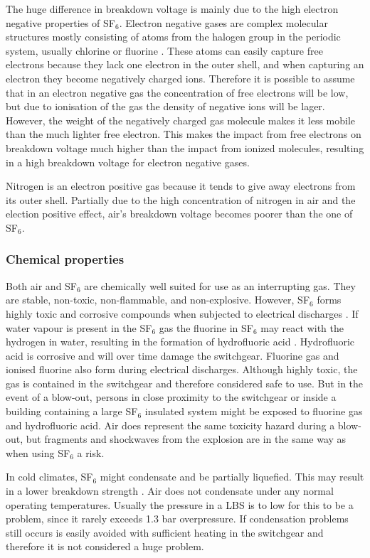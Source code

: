 \documentclass[10pt,a4paper,twoside]{article}
\begin{document}
The huge difference in breakdown voltage is mainly due to the high electron negative properties of SF$_6$. Electron negative gases are complex molecular structures mostly consisting of atoms from the halogen group in the periodic system, usually chlorine or fluorine \cite{bib:TET4160HVIM}. These atoms can easily capture free electrons because they lack one electron in the outer shell, and when capturing an electron they become negatively charged ions. Therefore it is possible to assume that in an electron negative gas the concentration of free electrons will be low, but due to ionisation of the gas the density of negative ions will be lager. However, the weight of the negatively charged gas molecule makes it less mobile than the much lighter free electron. This makes the impact from free electrons on breakdown voltage much higher than the impact from ionized molecules, resulting in a high breakdown voltage for electron negative gases.

Nitrogen is an electron positive gas because it tends to give away electrons from its outer shell. Partially due to the high concentration of nitrogen in air and the election positive effect, air's breakdown voltage becomes poorer than the one of SF$_6$.

\subsubsection*{Chemical properties}
Both air and SF$_6$ are chemically well suited for use as an interrupting gas. They are stable, non-toxic, non-flammable, and non-explosive. However, SF$_6$ forms highly toxic and corrosive compounds when subjected to electrical discharges \cite{bib:SF6PI}. If water vapour is present in the SF$_6$ gas the fluorine in SF$_6$ may react with the hydrogen in water, resulting in the formation of hydrofluoric acid \cite{bib:SF6PI}. Hydrofluoric acid is corrosive and will over time damage the switchgear. Fluorine gas and ionised fluorine also form during electrical discharges. Although highly toxic, the gas is contained in the switchgear and therefore considered safe to use. But in the event of a blow-out, persons in close proximity to the switchgear or inside a building containing a large SF$_6$ insulated system might be exposed to fluorine gas and hydrofluoric acid. Air does represent the same toxicity hazard during a blow-out, but fragments and shockwaves from the explosion are in the same way as when using SF$_6$ a risk.

In cold climates, SF$_6$ might condensate and be partially liquefied. This may result in a lower breakdown strength \cite{bib:SF6PI}. Air does not condensate under any normal operating temperatures. Usually the pressure in a LBS is to low for this to be a problem, since it rarely exceeds 1.3 bar overpressure. If condensation problems still occurs is easily avoided with sufficient heating in the switchgear and therefore it is not considered a huge problem.
\end{document}
